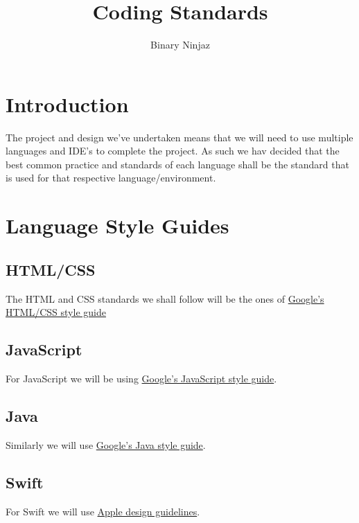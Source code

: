 \documentclass[12pt]{article}
\title{Coding Standards}
\author{Binary Ninjaz}
\date{}
\begin{document}
  \maketitle
  \newpage
  
  \tableofcontents
  \newpage
  
  \section{Introduction}
  The project and design we've undertaken means that we will need to use multiple languages and IDE's to complete the project. As such we hav decided that the best common practice and standards of each language shall be the standard that is used for that respective language/environment.
  
  \section{Language Style Guides}
  \subsection{HTML/CSS}
  The HTML and CSS standards we shall follow will be the ones of \href{https://google.github.io/styleguide/htmlcssguide.html}{Google's HTML/CSS style guide}
  
  \subsection{JavaScript}
  For JavaScript we will be using \href{https://google.github.io/styleguide/jsguide.html}{Google's JavaScript style guide}.
  
  \subsection{Java}
  Similarly we will use \href{https://google.github.io/styleguide/javaguide.html}{Google's Java style guide}.
  \subsection{Swift}
  For Swift we will use \href{https://swift.org/documentation/api-design-guidelines/}{Apple design guidelines}.
  
  
\end{document}
